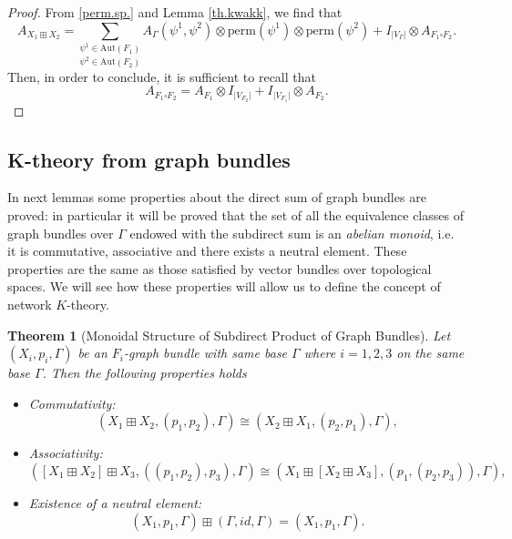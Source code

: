 \documentclass{amsart}
\newtheorem{thm}[theo]{Theorem}
\theoremstyle{definition}
\numberwithin{equation}{section}
\begin{document}
\begin{proof}
From \eqref{perm.sp.} and Lemma \ref{th.kwakk}, we find that
 \begin{equation}
A_{X_1 \boxplus X_2} = {\underset{\psi^2 \in \mathrm{Aut}(F_2)}{\underset{\psi^1 \in \mathrm{Aut}(F_1)}\sum}} A_{\Gamma}(\psi^1, \psi^2) \otimes \mathrm{perm}(\psi^1) \otimes \mathrm{perm}(\psi^2)+ I_{\vert V_{\Gamma} \vert} \otimes A_{F_1 \square F_2}.
\end{equation}
Then, in order to conclude, it is sufficient to recall that 
\begin{equation}
A_{F_1 \square F_2} = A_{F_1} \otimes I_{\vert V_{F_2} \vert }  + I_{\vert V_{F_1} \vert } \otimes A_{F_2}.
\end{equation}
\end{proof}
\subsection{K-theory from graph bundles}
In next lemmas some properties about the direct sum of graph bundles are proved: in particular it will be proved that the set of all the equivalence classes of graph bundles over $\Gamma$ endowed with the subdirect sum is an \textit{abelian monoid}, i.e. it is commutative, associative and there exists a neutral element.
These properties are the same as those satisfied by vector bundles over topological spaces. We will see how these properties will allow us to define the concept of network $K$-theory.
\begin{thm}[Monoidal Structure of Subdirect Product of Graph Bundles]\label{5thmaintheorem}
Let $(X_i, p_i, \Gamma)$ be an $F_i$-graph bundle with same base $\Gamma$ where $i=1,2,3$ on the same base $\Gamma$. Then the following properties holds
\begin{itemize}
    \item[{\rm (1).}] Commutativity: 
    \begin{equation*}
        (X_1 \boxplus X_2, (p_1,p_2), \Gamma) \cong (X_2 \boxplus X_1, (p_2,p_1), \Gamma),
    \end{equation*}
    \item[{\rm (2).}] Associativity: 
    \begin{equation*}
        ([X_1 \boxplus X_2] \boxplus X_3, ((p_1,p_2), p_3), \Gamma) \cong (X_1 \boxplus [X_2 \boxplus X_3], (p_1,(p_2,p_3)), \Gamma),
    \end{equation*}
    \item[{\rm (3).}] Existence of a neutral element: 
    \begin{equation*}
        (X_1, p_1, \Gamma) \boxplus (\Gamma, id, \Gamma) = (X_1, p_1, \Gamma).
    \end{equation*}
\end{itemize}
\end{thm}
\end{document}
